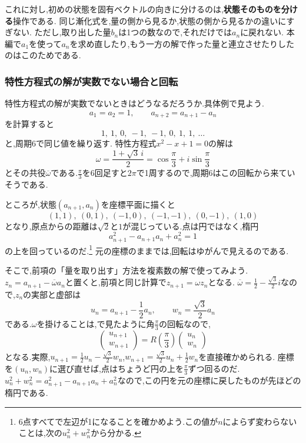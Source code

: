 これに対し,初めの状態を固有ベクトルの向きに分けるのは,\textbf{状態そのものを分ける}操作である.
同じ漸化式を,量の側から見るか,状態の側から見るかの違いにすぎない.
ただし,取り出した量$b_n$は1つの数なので,それだけでは$a_n$に戻れない.
本編で$a_1$を使って$a_n$を求め直したり,もう一方の解で作った量と連立させたりしたのはこのためである.

\subsubsection{特性方程式の解が実数でない場合と回転}\label{節：特性方程式の解が実数でない場合と回転}
特性方程式の解が実数でないときはどうなるだろうか.具体例で見よう.
\[
  a_1=a_2=1,\qquad a_{n+2}=a_{n+1}-a_n
\]
を計算すると
\[
  1,\ 1,\ 0,\ -1,\ -1,\ 0,\ 1,\ 1,\ \ldots
\]
と,周期6で同じ値を繰り返す.
特性方程式$x^2-x+1=0$の解は
\[
  \omega=\frac{1+\sqrt3\,i}{2}=\cos\frac{\pi}{3}+i\sin\frac{\pi}{3}
\]
とその共役$\overline\omega$である.$\frac{\pi}{3}$を6回足すと$2\pi$で1周するので,周期6はこの回転から来ていそうである.

ところが,状態$(a_{n+1},a_n)$を座標平面に描くと
\[
  (1,1),\ (0,1),\ (-1,0),\ (-1,-1),\ (0,-1),\ (1,0)
\]
となり,原点からの距離は$\sqrt2$と$1$が混じっている.点は円ではなく,楕円
\[
  a_{n+1}^2-a_{n+1}a_n+a_n^2=1
\]
の上を回っているのだ.\footnote{6点すべてで左辺が1になることを確かめよう.この値が$n$によらず変わらないことは,次の$u_n^2+w_n^2$から分かる.}
元の座標のままでは,回転はゆがんで見えるのである.

そこで,前項の「量を取り出す」方法を複素数の解で使ってみよう.
$z_n=a_{n+1}-\overline\omega a_n$と置くと,前項と同じ計算で$z_{n+1}=\omega z_n$となる.
$\overline\omega=\frac12-\frac{\sqrt3}{2}i$なので,$z_n$の実部と虚部は
\[
  u_n=a_{n+1}-\frac12a_n,\qquad w_n=\frac{\sqrt3}{2}a_n
\]
である.$\omega$を掛けることは,で見たように角$\frac{\pi}{3}$の回転なので,
\[
  \begin{pmatrix}u_{n+1}\\w_{n+1}\end{pmatrix}
  =R\left(\frac{\pi}{3}\right)\begin{pmatrix}u_n\\w_n\end{pmatrix}
\]
となる.実際,$u_{n+1}=\frac12u_n-\frac{\sqrt3}{2}w_n$,$w_{n+1}=\frac{\sqrt3}{2}u_n+\frac12w_n$を直接確かめられる.
座標を$(u_n,w_n)$に選び直せば,点はちょうど円の上を$\frac{\pi}{3}$ずつ回るのだ.
$u_n^2+w_n^2=a_{n+1}^2-a_{n+1}a_n+a_n^2$なので,この円を元の座標に戻したものが先ほどの楕円である.

